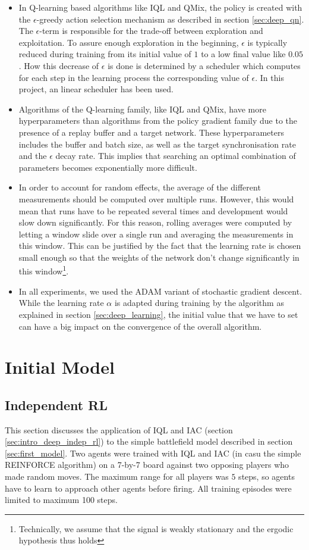 \begin{itemize}
    \item In Q-learning based algorithms like IQL and QMix, the policy is created with the $\epsilon$-greedy action selection mechanism as described in section \ref{sec:deep_qn}. The $\epsilon$-term is responsible for the trade-off between exploration and exploitation. To assure enough exploration in the beginning, $\epsilon$ is typically reduced during training from its initial value of $1$ to a low final value like $0.05$. How this decrease of $\epsilon$ is done is determined by a scheduler which computes for each step in the learning process the corresponding value of $\epsilon$. In this project, an linear scheduler has been used.
    \item Algorithms of the Q-learning family, like IQL and QMix, have more hyperparameters than algorithms from the policy gradient family due to the presence of a replay buffer and a target network. These hyperparameters includes the buffer and batch size, as well as the target synchronisation rate and the $\epsilon$ decay rate. This implies that searching an optimal combination of parameters becomes exponentially more difficult.
    \item In order to account for random effects, the average of the different measurements should be computed over multiple runs. However, this would mean that runs have to be repeated several times and development would slow down significantly. For this reason, rolling averages were computed by letting a window slide over a single run and averaging the measurements in this window. This can be justified by the fact that the learning rate is chosen small enough so that the weights of the network don't change significantly in this window\footnote{Technically, we assume that the signal is weakly stationary and the ergodic hypothesis thus holds}.
    \item In all experiments, we used the ADAM variant of stochastic gradient descent. While the learning rate $\alpha$ is adapted during training by the algorithm as explained in section \ref{sec:deep_learning}, the initial value that we have to set can have a big impact on the convergence of the overall algorithm.
\end{itemize}

\section{Initial Model}
\subsection{Independent RL}
\label{sec:init_model_iql}
This section discusses the application of IQL and IAC (section \ref{sec:intro_deep_indep_rl}) to the simple battlefield model described in section \ref{sec:first_model}. Two agents were trained with IQL and IAC (in casu the simple REINFORCE algorithm) on a 7-by-7 board against two opposing players who made random moves. The maximum range for all players was $5$ steps, so agents have to learn to approach other agents before firing. All training episodes were limited to maximum 100 steps.\\


